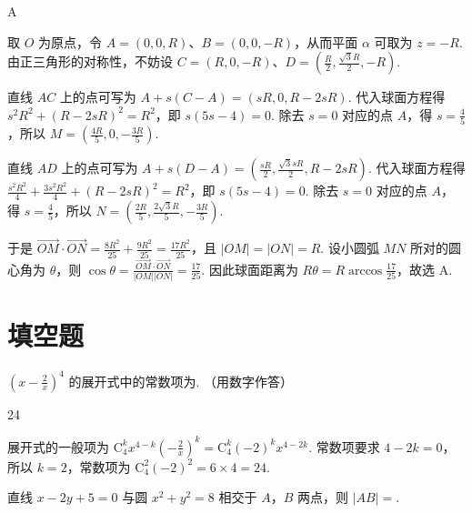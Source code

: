 \begin{answer}
A
\end{answer}

\begin{solution}
取 \(O\) 为原点，令 \(A=(0,0,R)\)、\(B=(0,0,-R)\)，从而平面 \(\alpha\) 可取为 \(z=-R\). 由正三角形的对称性，不妨设 \(C=(R,0,-R)\)、\(D=\left(\frac R2,\frac{\sqrt3R}{2},-R\right)\).

直线 \(AC\) 上的点可写为 \(A+s(C-A)=(sR,0,R-2sR)\). 代入球面方程得 \(s^2R^2+(R-2sR)^2=R^2\)，即 \(s(5s-4)=0\). 除去 \(s=0\) 对应的点 \(A\)，得 \(s=\frac{4}{5}\)，所以 \(M=\left(\frac{4R}{5},0,-\frac{3R}{5}\right)\).

直线 \(AD\) 上的点可写为 \(A+s(D-A)=\left(\frac{sR}{2},\frac{\sqrt3sR}{2},R-2sR\right)\). 代入球面方程得
\(\frac{s^2R^2}{4}+\frac{3s^2R^2}{4}+(R-2sR)^2=R^2\)，即 \(s(5s-4)=0\). 除去 \(s=0\) 对应的点 \(A\)，得 \(s=\frac{4}{5}\)，所以 \(N=\left(\frac{2R}{5},\frac{2\sqrt3R}{5},-\frac{3R}{5}\right)\).

于是 \(\overrightarrow{OM}\cdot\overrightarrow{ON}=\frac{8R^2}{25}+\frac{9R^2}{25}=\frac{17R^2}{25}\)，且 \(|OM|=|ON|=R\). 设小圆弧 \(MN\) 所对的圆心角为 \(\theta\)，则 \(\cos\theta=\frac{\overrightarrow{OM}\cdot\overrightarrow{ON}}{|OM||ON|}=\frac{17}{25}\). 因此球面距离为 \(R\theta=R\arccos\frac{17}{25}\)，故选 A.
\end{solution}

\section{填空题}

\begin{problem}
\(\left(x - \frac{2}{x}\right)^4\) 的展开式中的常数项为\fillinblank{}. （用数字作答）

\end{problem}

\begin{answer}
24
\end{answer}

\begin{solution}
展开式的一般项为 \(\mathrm C_4^k x^{4-k}\left(-\frac2x\right)^k=\mathrm C_4^k(-2)^k x^{4-2k}\). 常数项要求 \(4-2k=0\)，所以 \(k=2\)，常数项为 \(\mathrm C_4^2(-2)^2=6\times4=24\).
\end{solution}

\begin{problem}
直线 \(x - 2y + 5 = 0\) 与圆 \(x^{2} + y^{2} = 8\) 相交于 \(A\)，\(B\) 两点，则 \(|AB| = \)\fillinblank{}.
\end{problem}

